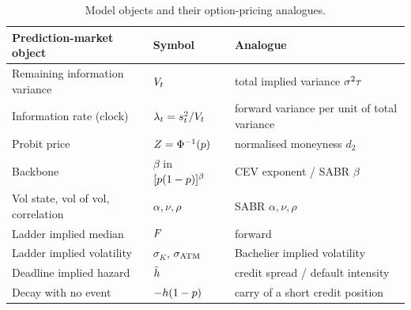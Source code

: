 \begin{table}[t]
\centering
\begin{threeparttable}
\caption{Model objects and their option-pricing analogues.}\label{tab:model-map}
\small
\begin{tabular}{@{}lll@{}}
\toprule
Prediction-market object & Symbol & Analogue \\
\midrule
Remaining information variance & $V_t$ & total implied variance $\sigma^2\tau$ \\
Information rate (clock) & $\lambda_t=s_t^2/V_t$ & forward variance per unit of total variance \\
Probit price & $Z=\Phi^{-1}(p)$ & normalised moneyness $d_2$ \\
Backbone & $\beta$ in $[p(1-p)]^\beta$ & CEV exponent / SABR $\beta$ \\
Vol state, vol of vol, correlation & $\alpha,\nu,\rho$ & SABR $\alpha,\nu,\rho$ \\
Ladder implied median & $F$ & forward \\
Ladder implied volatility & $\sigma_K$, $\sigma_{\mathrm{ATM}}$ & Bachelier implied volatility \\
Deadline implied hazard & $\bar h$ & credit spread / default intensity \\
Decay with no event & $-h(1-p)$ & carry of a short credit position \\
\bottomrule
\end{tabular}
\end{threeparttable}
\end{table}
